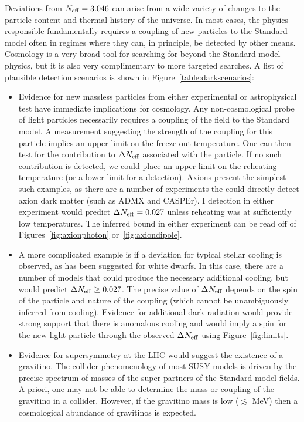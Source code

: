 Deviations from $N_{\rm eff} = 3.046$ can arise from a wide variety of changes to the particle content and thermal history of the universe.  In most cases, the physics responsible fundamentally requires a coupling of new particles to the Standard model often in regimes where they can, in principle, be detected by other means.  Cosmology is a very broad tool for searching for beyond the Standard model physics, but it is also very complimentary to more targeted searches.  A list of plausible detection scenarios is shown in Figure~\ref{table:darkscenarios}:
\begin{itemize}
\item Evidence for new massless particles from either experimental or astrophysical test have immediate implications for cosmology.  Any non-cosmological probe of light particles necessarily requires a coupling of the field to the Standard model.  A measurement suggesting the strength of the coupling for this particle implies an upper-limit on the freeze out temperature.  One can then test for the contribution to $\Delta N_{\rm eff}$ associated with the particle.  If no such contribution is detected, we could place an upper limit on the reheating temperature (or a lower limit for a detection).  Axions present the simplest such examples, as there are a number of experiments the could directly detect axion dark matter (such as ADMX and CASPEr).  I detection in either experiment would predict $\Delta N_{\rm eff} = 0.027$ unless reheating was at sufficiently low temperatures.  The inferred bound in either experiment can be read off of Figures~\ref{fig:axionphoton} or~\ref{fig:axiondipole}.

\item A more complicated example is if a deviation for typical stellar cooling is observed, as has been suggested for white dwarfs.  In this case, there are a number of models that could produce the necessary additional cooling, but would predict $\Delta N_{\rm eff} \geq 0.027$.  The precise value of $\Delta N_{\rm eff}$ depends on the spin of the particle and nature of the coupling (which cannot be unambiguously inferred from cooling).  Evidence for additional dark radiation would provide strong support that there is anomalous cooling and would imply a spin for the new light particle through the observed $\Delta N_{\rm eff}$ using Figure~\ref{fig:limits}.

\item Evidence for supersymmetry at the LHC would suggest the existence of a gravitino.  The collider phenomenology of most SUSY models is driven by the precise spectrum of masses of the super partners of the Standard model fields.  A priori, one may not be able to determine the mass or coupling of the gravitino in a collider.  However, if the gravitino mass is low ($\lesssim$ MeV) then a cosmological abundance of gravitinos is expected.


\end{itemize}
